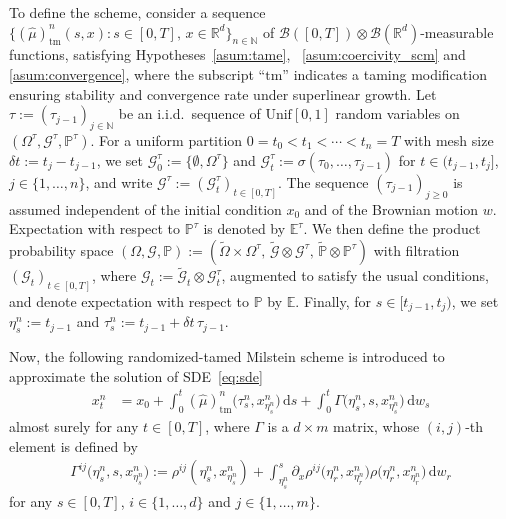 \documentclass[reqno,  oneside, 12pt]{amsart}
\newcommand{\E}{\mathbb E}
\newcommand{\PP}{\mathbb P}
\begin{document}
To define the scheme, consider a sequence  $\{(\widehat{\mu})^{n}_{\mathrm{tm}}(s,x) : s \in [0,T],\, x \in \mathbb{R}^d\}_{n \in \mathbb{N}}$ of \(\mathscr{B}([0,T]) \otimes \mathscr{B}(\mathbb{R}^d)\)-measurable functions, satisfying Hypotheses~\textnormal{\ref{asum:tame}}, ~\textnormal{\ref{asum:coercivity_scm}} and  \textnormal{\ref{asum:convergence}}, where the subscript ``$\mathrm{tm}$'' indicates a taming modification ensuring stability and convergence rate under superlinear growth. 
Let \(\tau := (\tau_{j-1})_{j\in\mathbb{N}}\) be an i.i.d.\ sequence of \(\mathrm{Unif}[0,1]\) random variables on \((\Omega^{\tau}, \mathscr{G}^{\tau}, \PP^{\tau})\). For a uniform partition \(0=t_0< t_1<\cdots<t_n=T\) with mesh size \(\delta t := t_j-t_{j-1}\), we set \(\mathscr{G}_0^{\tau}:=\{\emptyset,\Omega^\tau\}\) and \(\mathscr{G}_t^{\tau} := \sigma(\tau_0,\dots,\tau_{j-1})\) for \(t\in(t_{j-1},t_j]\), \(j\in\{1,\ldots,n\}\), and write \(\mathcal{G}^\tau := (\mathscr{G}_t^\tau)_{t\in[0,T]}\). The sequence \((\tau_{j-1})_{j\geq 0}\) is assumed independent of the initial condition \(x_0\) and of the Brownian motion \(w\). Expectation with respect to \(\PP^\tau\) is denoted by \(\E^\tau\). We then define the product probability space \((\Omega,\mathscr{G},\PP) := (\tilde{\Omega}\times\Omega^{\tau},\, \tilde{\mathscr{G}}\otimes \mathscr{G}^{\tau},\, \tilde{\PP}\otimes \PP^{\tau})\) with filtration \((\mathscr{G}_t)_{t\in[0,T]}\), where \(\mathscr{G}_t := \tilde{\mathscr{G}}_t \otimes \mathscr{G}_t^\tau\), augmented to satisfy the usual conditions, and denote expectation with respect to \(\PP\) by \(\E\). Finally, for \(s\in[t_{j-1},t_j)\), we set \(\eta_s^n := t_{j-1}\) and \(\tau_s^n := t_{j-1}+\delta t\,\tau_{j-1}\).






Now, the following {randomized-tamed Milstein scheme} is introduced to approximate the solution of SDE~\eqref{eq:sde}
\begin{align}  
	x_t^{n} &= x_{0} + \int_{0}^{t} (\widehat{\mu})_{\mathrm{tm}}^{n}\big(\tau_s^n, x_{\eta_s^n}^{n}\big) \, \mathrm{d}s + \int_{0}^{t} \Gamma\big(\eta_s^n, s, x_{\eta_s^n}^{n}\big) \, \mathrm{d}w_s \label{eq:scm}
\end{align}
almost surely for any $t \in [0,T]$, where $\Gamma$ is a $d \times m$ matrix, whose $(i,j)$-th element is  defined by
\begin{align}
	\Gamma^{ij}\big(\eta_s^n, s, x_{\eta_s^n}^{n}\big) := \rho^{ij}(\eta_s^n, x_{\eta_s^n}^{n}) + \int_{\eta_s^n}^{s} \partial_x \rho^{ij}\big(\eta_r^n, x_{\eta_r^n}^{n}\big) \rho\big(\eta_r^n, x_{\eta_r^n}^{n}\big) \, \mathrm{d}w_r \label{eq:Gam}
\end{align}
for any $s \in [0,T]$,  $i\in\{1,\ldots,d\}$ and $j\in\{1,\ldots,m\}$.
\end{document}
